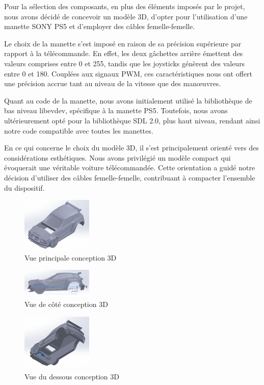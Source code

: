 Pour la sélection des composants, en plus des éléments imposés par le projet, nous avons décidé de concevoir un modèle 3D, d'opter pour l'utilisation d'une manette SONY PS5 et d'employer des câbles femelle-femelle.

Le choix de la manette s'est imposé en raison de sa précision supérieure par rapport à la télécommande. En effet, les deux gâchettes arrière émettent des valeurs comprises entre 0 et 255, tandis que les joysticks génèrent des valeurs entre 0 et 180. Couplées aux signaux PWM, ces caractéristiques nous ont offert une précision accrue tant au niveau de la vitesse que des manœuvres.

Quant au code de la manette, nous avons initialement utilisé la bibliothèque de bas niveau libevdev, spécifique à la manette PS5. Toutefois, nous avons ultérieurement opté pour la bibliothèque SDL 2.0, plus haut niveau, rendant ainsi notre code compatible avec toutes les manettes.

En ce qui concerne le choix du modèle 3D, il s'est principalement orienté vers des considérations esthétiques. Nous avons privilégié un modèle compact qui évoquerait une véritable voiture télécommandée. Cette orientation a guidé notre décision d'utiliser des câbles femelle-femelle, contribuant à compacter l'ensemble du dispositif.

\begin{figure}[h]
    \centering
    \includegraphics[width=0.3\textwidth]{images/solidworks/solidworks1.png}
    \caption{Vue principale conception 3D}
    \label{fig:Vue principale conception 3D}
\end{figure}

\begin{figure}[h]
    \centering
    \includegraphics[width=0.3\textwidth]{images/solidworks/solidworks3.png}
    \caption{Vue de côté conception 3D}
    \label{fig:Vue de côté conception 3D}
\end{figure}

\begin{figure}[h]
    \centering
    \includegraphics[width=0.3\textwidth]{images/solidworks/solidworks4.png}
    \caption{Vue du dessous conception 3D}
    \label{fig:Vue du dessous conception 3D}
\end{figure}

\newpage